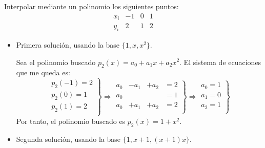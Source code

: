 \begin{ejemplo}
    Interpolar mediante un polinomio los siguientes puntos:
    \begin{equation*}
        \begin{array}{c|ccc}
            x_i & -1 & 0 & 1 \\ \hline
            y_i & 2 & 1 & 2
        \end{array}
    \end{equation*}

    \begin{itemize}
        \item Primera solución, usando la base $\{1, x, x^2\}$.
        
        Sea el polinomio buscado $p_2(x) = a_0 + a_1x + a_2x^2$. El sistema de ecuaciones que me queda es:
        \begin{equation*}
            \left. \begin{array}{c}
                p_2(-1)=2 \\
                p_2(0)=1 \\
                p_2(1)=2 \\
            \end{array} \right\} \Longrightarrow
            \left. \begin{array}{cccc}
                a_0 & -a_1 & +a_2 & =2 \\
                a_0 &&&=1 \\
                a_0 & + a_1 &+a_2 &= 2 \\
            \end{array} \right\} \Longrightarrow
            \left. \begin{array}{c}
                a_0=1 \\
                a_1=0 \\
                a_2=1 \\
            \end{array} \right\}
        \end{equation*}
        Por tanto, el polinomio buscado es $p_2(x)=1+x^2$.

        \item Segunda solución, usando la base $\{1, x+1, (x+1)x\}$.
        

\end{itemize}
\end{ejemplo}
